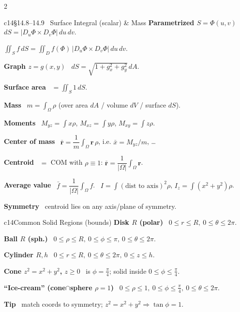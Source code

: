 \documentclass[10pt]{extarticle}
\newcommand{\h}[1]{{\bfseries #1}\ }
\begin{document}
\begin{multicols}{2}
\begin{tbox}{c14}{§14.8--14.9 \ Surface Integral (scalar) \& Mass}
\h{Parametrized $S=\Phi(u,v)$} $dS=\big|D_u\Phi\times D_v\Phi\big|\,du\,dv$.\par
$\displaystyle\iint_S f\,dS=\iint_{D} f(\Phi)\,\big|D_u\Phi\times D_v\Phi\big|\,du\,dv$.\par
\h{Graph $z=g(x,y)$} $dS=\sqrt{1+g_x^{2}+g_y^{2}}\,dA$.\par
\h{Surface area} $=\iint_S 1\,dS$.\par
\h{Mass} $m=\int_\Omega\rho$ (over area $dA$ / volume $dV$ / surface $dS$).\par
\h{Moments} $M_{yz}{=}\int x\rho$, $M_{xz}{=}\int y\rho$, $M_{xy}{=}\int z\rho$.\par
\h{Center of mass} $\bar{\mathbf r}=\dfrac1m\!\int_\Omega\mathbf r\,\rho$, i.e. $\bar x=M_{yz}/m$, \dots\par
\h{Centroid} $=$ COM with $\rho\equiv1$: $\bar{\mathbf r}=\dfrac1{|\Omega|}\!\int_\Omega\mathbf r$.\par
\h{Average value} $\bar f=\dfrac1{|\Omega|}\!\int_\Omega f$.\quad \h{Inertia} $I=\int(\text{dist to axis})^2\rho$, $I_z=\int(x^2+y^2)\rho$.\par
\h{Symmetry} centroid lies on any axis/plane of symmetry.
\end{tbox}

\begin{tbox}{c14}{Common Solid Regions (bounds)}
\h{Disk $R$ (polar)} $0\!\le\!r\!\le\!R,\ 0\!\le\!\theta\!\le\!2\pi$.\par
\h{Ball $R$ (sph.)} $0\!\le\!\rho\!\le\!R,\ 0\!\le\!\phi\!\le\!\pi,\ 0\!\le\!\theta\!\le\!2\pi$.\par
\h{Cylinder $R,h$} $0\!\le\!r\!\le\!R,\ 0\!\le\!\theta\!\le\!2\pi,\ 0\!\le\!z\!\le\!h$.\par
\h{Cone $z^2{=}x^2{+}y^2$, $z\!\ge\!0$} is $\phi=\tfrac\pi4$; solid inside $0\!\le\!\phi\!\le\!\tfrac\pi4$.\par
\h{``Ice-cream'' (cone$\cap$sphere $\rho{=}1$)} $0\!\le\!\rho\!\le\!1,\ 0\!\le\!\phi\!\le\!\tfrac\pi4,\ 0\!\le\!\theta\!\le\!2\pi$.\par
\h{Tip} match coords to symmetry; $z^2{=}x^2{+}y^2\Rightarrow\tan\phi{=}1$.
\end{tbox}



\end{multicols}
\end{document}
